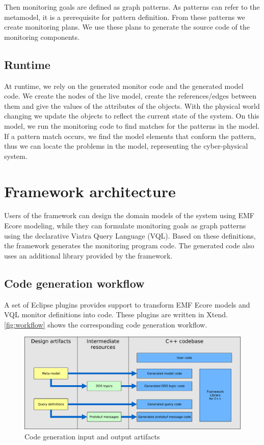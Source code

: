 Then monitoring goals are defined as graph patterns. 
As patterns can refer to the metamodel, it is a prerequisite for pattern definition. 
From these patterns we create monitoring plans. 
We use these plans to generate the source code of the monitoring components.

\subsection{Runtime}

At runtime, we rely on the generated monitor code and the generated model code. 
We create the nodes of the live model, create the references/edges between them and give the values of the attributes of the objects. 
With the physical world changing we update the objects to reflect the current state of the system. 
On this model, we run the monitoring code to find matches for the patterns in the model. 
If a pattern match occurs, we find the model elements that conform the pattern, thus we can locate the problems in the model, representing the cyber-physical system.


\section{Framework architecture}

Users of the framework can design the domain models of the system using EMF Ecore modeling, while they can formulate monitoring goals as graph patterns using the declarative Viatra Query Language (VQL).
Based on these definitions, the framework generates the monitoring \cpp{} program code.
The generated code also uses an additional library provided by the framework.

\subsection{Code generation workflow}
A set of Eclipse plugins provides support to transform EMF Ecore models and VQL monitor definitions into \cpp{} code. 
These plugins are written in Xtend.
\autoref{fig:workflow} shows the corresponding code generation workflow.

\begin{figure}[H]
	\begin{center}
		\includegraphics[width=\textwidth]{figures/workflow.pdf}
		\caption{Code generation input and output artifacts}
		\label{fig:workflow}
	\end{center}
\end{figure}

